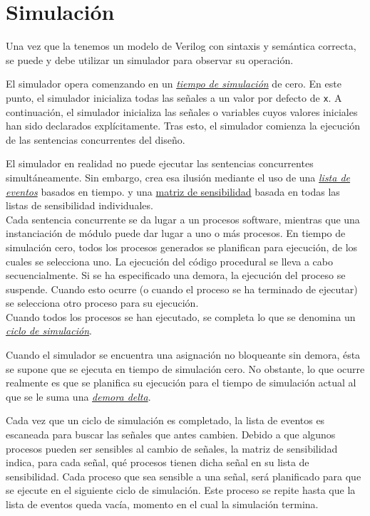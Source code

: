 \section{Simulación}

Una vez que la tenemos un modelo de Verilog con sintaxis y semántica correcta, se puede y debe utilizar un simulador para observar su operación.

El simulador opera comenzando en un \hyperlink{simulation_time}{\emph{tiempo de simulación}} de cero. En este punto, el simulador inicializa todas las señales a un valor por defecto de \verb|x|. A continuación, el simulador inicializa las señales o variables cuyos valores iniciales han sido declarados explícitamente. Tras esto, el simulador comienza la ejecución de las sentencias concurrentes del diseño.

\begin{aclaracion}[Aclaración]
    El simulador en realidad no puede ejecutar las sentencias concurrentes simultáneamente. Sin embargo, crea esa ilusión mediante el uso de una \hyperlink{event_list}{\emph{lista de eventos}} basados en tiempo. y una \hyperlink{sensitivity_matrix}{matriz de sensibilidad} basada en todas las listas de sensibilidad individuales.\\

    Cada sentencia concurrente se da lugar a un procesos software, mientras que una instanciación de módulo puede dar lugar a uno o más procesos. En tiempo de simulación cero, todos los procesos generados se planifican para ejecución, de los cuales se selecciona uno. La ejecución del código procedural se lleva a cabo secuencialmente. Si se ha especificado una demora, la ejecución del proceso se suspende. Cuando esto ocurre (o cuando el proceso se ha terminado de ejecutar) se selecciona otro proceso para su ejecución.\\

    Cuando todos los procesos se han ejecutado, se completa lo que se denomina un \hyperlink{simulation_cycle}{\emph{ciclo de simulación}}.
\end{aclaracion}

Cuando el simulador se encuentra una asignación no bloqueante sin demora, ésta se supone que se ejecuta en tiempo de simulación cero. No obstante, lo que ocurre realmente es que se planifica su ejecución para el tiempo de simulación actual al que se le suma una \hyperlink{delta_delay}{\emph{demora delta}}. 

Cada vez que un ciclo de simulación es completado, la lista de eventos es escaneada para buscar las señales que antes cambien. Debido a que algunos procesos pueden ser sensibles al cambio de señales, la matriz de sensibilidad indica, para cada señal, qué procesos tienen dicha señal en su lista de sensibilidad. Cada proceso que sea sensible a una señal, será planificado para que se ejecute en el siguiente ciclo de simulación. Este proceso se repite hasta que la lista de eventos queda vacía, momento en el cual la simulación termina.